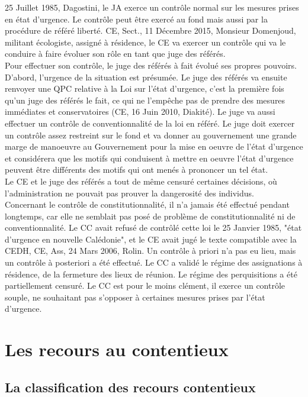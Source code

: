 \documentclass[10pt, a4paper, openany]{book}
\begin{document}
25 Juillet 1985, Dagostini, le JA exerce un contrôle normal sur les mesures prises en état d'urgence. Le contrôle peut être exercé au fond mais aussi par la procédure de référé liberté. CE, Sect., 11 Décembre 2015, Monsieur Domenjoud, militant écologiste, assigné à résidence, le CE va exercer un contrôle qui va le conduire à faire évoluer son rôle en tant que juge des référés. \\
Pour effectuer son contrôle, le juge des référés à fait évolué ses propres pouvoirs. D'abord, l'urgence de la situation est présumée. Le juge des référés va ensuite renvoyer une QPC relative à la Loi sur l'état d'urgence, c'est la première fois qu'un juge des référés le fait, ce qui ne l'empêche pas de prendre des mesures immédiates et conservatoires (CE, 16 Juin 2010, Diakité). Le juge va aussi effectuer un contrôle de conventionnalité de la loi en référé. Le juge doit exercer un contrôle assez restreint sur le fond et va donner au gouvernement une grande marge de manoeuvre au Gouvernement pour la mise en oeuvre de l'état d'urgence et considérera que les motifs qui conduisent à mettre en oeuvre l'état d'urgence peuvent être différents des motifs qui ont menés à prononcer un tel état. \\
Le CE et le juge des référés a tout de même censuré certaines décisions, où l'administration ne pouvait pas prouver la dangerosité des individus. \\
Concernant le contrôle de constitutionnalité, il n'a jamais été effectué pendant longtemps, car elle ne semblait pas posé de problème de constitutionnalité ni de conventionnalité. Le CC avait refusé de contrôlé cette loi le 25 Janvier 1985, "état d'urgence en nouvelle Calédonie", et le CE avait jugé le texte compatible avec la CEDH, CE, Ass, 24 Mars 2006, Rolin. Un contrôle à priori n'a pas eu lieu, mais un contrôle à posteriori a été effectué. Le CC a validé le régime des assignations à résidence, de la fermeture des lieux de réunion. Le régime des perquisitions a été partiellement censuré. Le CC est pour le moins clément, il exerce un contrôle souple, ne souhaitant pas s'opposer à certaines mesures prises par l'état d'urgence. 

\part{Les recours au contentieux}

\chapter{La classification des recours contentieux}
\end{document}
